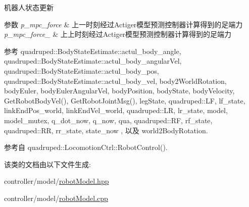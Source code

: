 机器人状态更新 


\begin{DoxyParams}{参数}
{\em p\+\_\+mpc\+\_\+force} & 上一时刻经过\+Actiger模型预测控制器计算得到的足端力 \\
\hline
{\em p\+\_\+mpc\+\_\+force\+\_} & 上上时刻经过\+Actiger模型预测控制器计算得到的足端力 \\
\hline
\end{DoxyParams}


参考 quadruped\+::\+Body\+State\+Estimate\+::actul\+\_\+body\+\_\+angle, quadruped\+::\+Body\+State\+Estimate\+::actul\+\_\+body\+\_\+angular\+Vel, quadruped\+::\+Body\+State\+Estimate\+::actul\+\_\+body\+\_\+pos, quadruped\+::\+Body\+State\+Estimate\+::actul\+\_\+body\+\_\+vel, body2\+World\+Rotation, body\+Euler, body\+Euler\+Angular\+Vel, body\+Position, body\+State, body\+Velocity, Get\+Robot\+Body\+Vel(), Get\+Robot\+Joint\+Msg(), leg\+State, quadruped\+::\+LF, lf\+\_\+state, link\+End\+Pos\+\_\+world, link\+End\+Vel\+\_\+world, quadruped\+::\+LR, lr\+\_\+state, model, model\+\_\+mutex, q\+\_\+dot\+\_\+now, q\+\_\+now, qua, quadruped\+::\+RF, rf\+\_\+state, quadruped\+::\+RR, rr\+\_\+state, state\+\_\+now , 以及 world2\+Body\+Rotation.



参考自 quadruped\+::\+Locomotion\+Ctrl\+::\+Robot\+Control().



该类的文档由以下文件生成\+:\begin{DoxyCompactItemize}
\item 
controller/model/\hyperlink{robotModel_8hpp}{robot\+Model.\+hpp}\item 
controller/model/\hyperlink{robotModel_8cpp}{robot\+Model.\+cpp}\end{DoxyCompactItemize}
